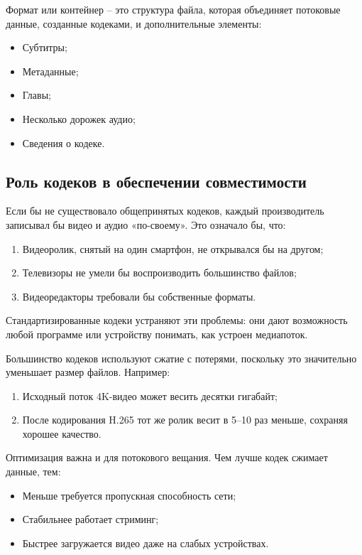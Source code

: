 \documentclass{ou}
\begin{document}
Формат или контейнер -- это структура файла, которая объединяет потоковые данные, созданные кодеками, и дополнительные элементы:
\begin{itemize}[label=-, leftmargin=0em, itemindent=3.35em, nosep]
\item Субтитры;
\item Метаданные;
\item Главы;
\item Несколько дорожек аудио;
\item Сведения о кодеке.
\end{itemize}
\subsection{Роль кодеков в обеспечении совместимости}
Если бы не существовало общепринятых кодеков, каждый производитель записывал бы видео и аудио «по-своему». Это означало бы, что:
\begin{enumerate}[leftmargin=0em, itemindent=3.75em, nosep, label=\arabic*)]
\item Видеоролик, снятый на один смартфон, не открывался бы на другом;
\item Телевизоры не умели бы воспроизводить большинство файлов;
\item Видеоредакторы требовали бы собственные форматы.
\end{enumerate}

Стандартизированные кодеки устраняют эти проблемы: они дают возможность любой программе или устройству понимать, как устроен медиапоток.

Большинство кодеков используют сжатие с потерями, поскольку это значительно уменьшает размер файлов. Например:
\begin{enumerate}[leftmargin=0em, itemindent=3.75em, nosep, label=\arabic*)]
\item Исходный поток 4K-видео может весить десятки гигабайт;
\item После кодирования H.265 тот же ролик весит в 5–10 раз меньше, сохраняя хорошее качество.
\end{enumerate}

Оптимизация важна и для потокового вещания. Чем лучше кодек сжимает данные, тем:
\begin{itemize}[label=-, leftmargin=0em, itemindent=3.35em, nosep]
\item Меньше требуется пропускная способность сети;
\item Стабильнее работает стриминг;
\item Быстрее загружается видео даже на слабых устройствах.
\end{itemize}
\end{document}
